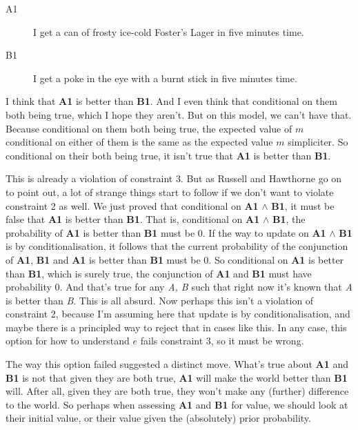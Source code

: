 \begin{description}
\item[A1]

I get a can of frosty ice-cold Foster's Lager in five minutes time.

\item[B1]

I get a poke in the eye with a burnt stick in five minutes time.
\end{description}
I think that \textbf{A1} is better than \textbf{B1}. And I even think that conditional on them both being true, which I hope they aren't. But on this model, we can't have that. Because conditional on them both being true, the expected value of $m$ conditional on either of them is the same as the expected value $m$ simpliciter. So conditional on their both being true, it isn't true that \textbf{A1} is better than \textbf{B1}.

This is already a violation of constraint 3. But as Russell and Hawthorne go on to point out, a lot of strange things start to follow if we don't want to violate constraint 2 as well. We just proved that conditional on \textbf{A1} $\wedge$ \textbf{B1}, it must be false that \textbf{A1} is better than \textbf{B1}. That is, conditional on \textbf{A1} $\wedge$ \textbf{B1}, the probability of \textbf{A1} is better than \textbf{B1} must be 0. If the way to update on \textbf{A1} $\wedge$ \textbf{B1} is by conditionalisation, it follows that the current probability of the conjunction of \textbf{A1}, \textbf{B1} and \textbf{A1} is better than \textbf{B1} must be 0. So conditional on \textbf{A1} is better than \textbf{B1}, which is surely true, the conjunction of \textbf{A1} and \textbf{B1} must have probability 0. And that's true for any \emph{A, B} such that right now it's known that \emph{A} is better than \emph{B}. This is all absurd. Now perhaps this isn't a violation of constraint 2, because I'm assuming here that update is by conditionalisation, and maybe there is a principled way to reject that in cases like this. In any case, this option for how to understand $e$ fails constraint 3, so it must be wrong.

The way this option failed suggested a distinct move. What's true about \textbf{A1} and \textbf{B1} is not that given they are both true, \textbf{A1} will make the world better than \textbf{B1} will. After all, given they are both true, they won't make any (further) difference to the world. So perhaps when assessing \textbf{A1} and \textbf{B1} for value, we should look at their initial value, or their value given the (absolutely) prior probability.

